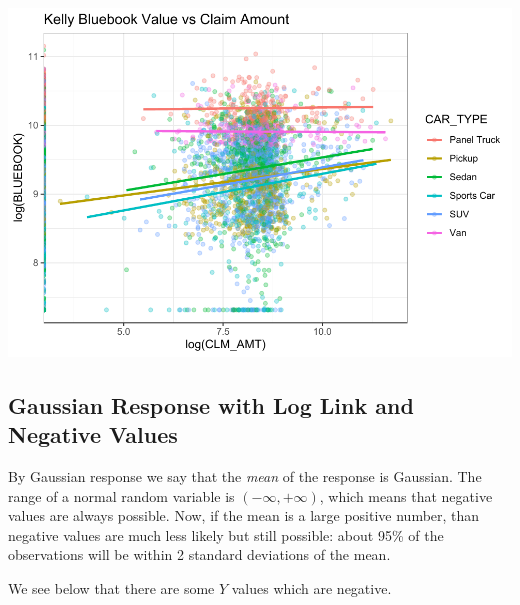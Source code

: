 \documentclass[openany]{book}
\newenvironment{Shaded}{\begin{snugshade}}{\end{snugshade}}
\newcommand{\ControlFlowTok}[1]{\textcolor[rgb]{0.13,0.29,0.53}{\textbf{#1}}}
\newcommand{\DataTypeTok}[1]{\textcolor[rgb]{0.13,0.29,0.53}{#1}}
\newcommand{\DecValTok}[1]{\textcolor[rgb]{0.00,0.00,0.81}{#1}}
\newcommand{\KeywordTok}[1]{\textcolor[rgb]{0.13,0.29,0.53}{\textbf{#1}}}
\newcommand{\NormalTok}[1]{#1}
\newcommand{\OperatorTok}[1]{\textcolor[rgb]{0.81,0.36,0.00}{\textbf{#1}}}
\newcommand{\StringTok}[1]{\textcolor[rgb]{0.31,0.60,0.02}{#1}}
\begin{document}
\includegraphics{05-linear-models_files/figure-latex/unnamed-chunk-24-1.pdf}

\hypertarget{gaussian-response-with-log-link-and-negative-values}{%
\subsection{Gaussian Response with Log Link and Negative Values}\label{gaussian-response-with-log-link-and-negative-values}}

By Gaussian response we say that the \emph{mean} of the response is Gaussian. The range of a normal random variable is \((-\infty, +\infty)\), which means that negative values are always possible. Now, if the mean is a large positive number, than negative values are much less likely but still possible: about 95\% of the observations will be within 2 standard deviations of the mean.

We see below that there are some \(Y\) values which are negative.

\begin{Shaded}
\end{Shaded}
\end{document}
